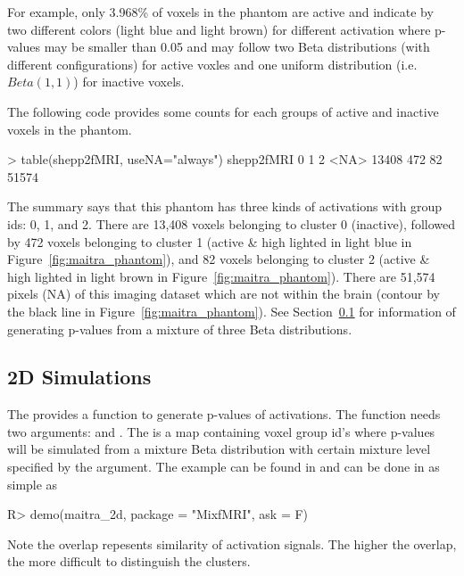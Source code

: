 For example, only 3.968\% of voxels in the  phantom are active
and indicate by two different colors (light blue and light brown)
for different activation where p-values may be smaller than 0.05
and may follow two Beta distributions (with different configurations)
for active voxles and one uniform distribution (i.e. $Beta(1, 1)$)
for inactive voxels.

The following code provides some counts for each groups of active and
inactive voxels in the  phantom.
\begin{CodeOutput}[title=Summary of shepp2fMRI Phantoms]
> table(shepp2fMRI, useNA="always")
shepp2fMRI
    0     1     2  <NA> 
13408   472    82 51574 
\end{CodeOutput}
The summary says that this phantom has three kinds of activations
with group ids: 0, 1, and 2.
There are 13,408 voxels belonging to cluster 0 (inactive),
followed by 472 voxels belonging to cluster 1 (active \& high lighted in
light blue in Figure~\ref{fig:maitra_phantom}), and
82 voxels belonging to cluster 2 (active \& high lighted in
light brown in Figure~\ref{fig:maitra_phantom}).
There are 51,574 pixels (NA) of this
imaging dataset which are not within the brain (contour by the black line
in Figure~\ref{fig:maitra_phantom}).
See Section~\ref{sec:2d_simulations} for information of generating
p-values from a mixture of three Beta distributions.


\subsection[2D Simulations]{2D Simulations}
\label{sec:2d_simulations}

The  provides a function 
to generate p-values of activations.
The function needs two arguments:  and .
The  is a map containing voxel group id's
where p-values will be simulated from a mixture Beta distribution with
certain mixture level specified by the  argument.
The example can be found in
 and can be done in 
as simple as
\begin{Code}[title=Simulations of Active Voxels]
R> demo(maitra_2d, package = "MixfMRI", ask = F)
\end{Code}
Note the overlap repesents similarity of activation signals. The higher
the overlap, the more difficult to distinguish the clusters.

